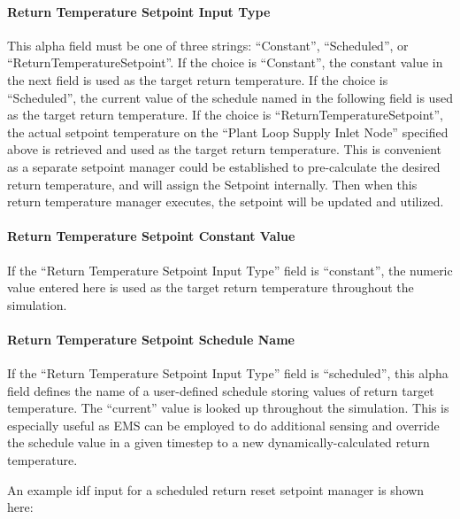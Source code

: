 \paragraph{Return Temperature Setpoint Input Type}\label{return-temperature-setpoint-input-type-1}

This alpha field must be one of three strings: ``Constant'', ``Scheduled'', or ``ReturnTemperatureSetpoint''. If the choice is ``Constant'', the constant value in the next field is used as the target return temperature. If the choice is ``Scheduled'', the current value of the schedule named in the following field is used as the target return temperature. If the choice is ``ReturnTemperatureSetpoint'', the actual setpoint temperature on the ``Plant Loop Supply Inlet Node'' specified above is retrieved and used as the target return temperature. This is convenient as a separate setpoint manager could be established to pre-calculate the desired return temperature, and will assign the Setpoint internally. Then when this return temperature manager executes, the setpoint will be updated and utilized.

\paragraph{Return Temperature Setpoint Constant Value}\label{return-temperature-setpoint-constant-value-1}

If the ``Return Temperature Setpoint Input Type'' field is ``constant'', the numeric value entered here is used as the target return temperature throughout the simulation.

\paragraph{Return Temperature Setpoint Schedule Name}\label{return-temperature-setpoint-schedule-name-1}

If the ``Return Temperature Setpoint Input Type'' field is ``scheduled'', this alpha field defines the name of a user-defined schedule storing values of return target temperature. The ``current'' value is looked up throughout the simulation. This is especially useful as EMS can be employed to do additional sensing and override the schedule value in a given timestep to a new dynamically-calculated return temperature.

An example idf input for a scheduled return reset setpoint manager is shown here:

